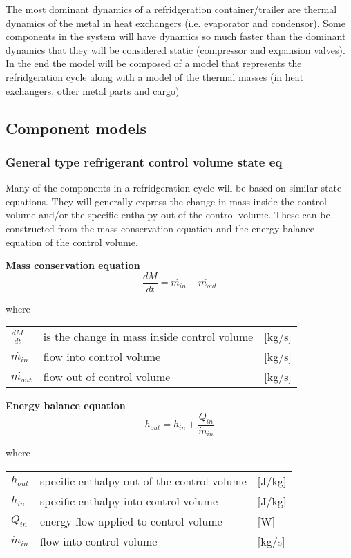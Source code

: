 The most dominant dynamics of a refridgeration container/trailer are thermal dynamics of the metal in heat exchangers (i.e. evaporator and condensor). Some components in the system will have dynamics so much faster than the dominant dynamics that they will be considered static (compressor and expansion valves).
In the end the model will be composed of a model that represents the refridgeration cycle along with a model of the thermal masses (in heat exchangers, other metal parts and cargo)


\subsection{Component models}

\subsubsection{General type refrigerant control volume state eq}
Many of the components in a refridgeration cycle will be based on similar state equations. They will generally express the change in mass inside the control volume and/or the specific enthalpy out of the control volume. These can be constructed from the mass conservation equation and the energy balance equation of the control volume.

\textbf{Mass conservation equation} \\
\begin{equation} \label{eq:GeneralTypeControlVol_MassConservation}
	\frac{dM}{dt} = \dot{m_{in}} - \dot{m_{out}}
\end{equation}

where 
\begin{center}
	\begin{tabular}{l p{8cm} l}
		$\frac{dM}{dt}$ & is the change in mass inside control volume & [\si{kg}/\si{s}]\\ 
		$\dot{m_{in}}$ & flow into control volume & [\si{kg}/\si{s}]\\
		$\dot{m_{out}}$ & flow out of control volume & [\si{kg}/\si{s}]\\
	\end{tabular}
\end{center}

\textbf{Energy balance equation}
\begin{equation}
	h_{out} = h_{in} + \frac{Q_{in}}{\dot{m}_{in}}
\end{equation}

where
\begin{center}
	\begin{tabular}{l p{8cm} l}
		$h_{out}$ & specific enthalpy out of the control volume & [\si{J}/\si{kg}]\\ 
		$h_{in}$ & specific enthalpy into control volume & [\si{J}/\si{kg}]\\ 
		$Q_{in}$ & energy flow applied to control volume& [\si{W}]\\
		$\dot{m}_{in}$ & flow into control volume & [\si{kg}/\si{s}]\\
	\end{tabular}
\end{center}

